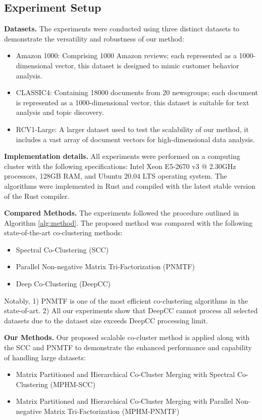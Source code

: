 \documentclass[journal]{IEEEtran}
\renewcommand{\cite}[1]{~\autocite{#1}}
\begin{document}
\subsection{Experiment Setup}

\textbf{Datasets.}
The experiments were conducted using three distinct datasets to demonstrate the versatility and robustness of our method:

\begin{itemize}
  \item Amazon 1000: Comprising 1000 Amazon reviews; each represented as a 1000-dimensional vector, this dataset is designed to mimic customer behavior analysis.
  \item CLASSIC4: Containing 18000 documents from 20 newsgroups; each document is represented as a 1000-dimensional vector, this dataset is suitable for text analysis and topic discovery.
  \item RCV1-Large: A larger dataset used to test the scalability of our method, it includes a vast array of document vectors for high-dimensional data analysis.
\end{itemize}

\textbf{Implementation details.}
All experiments were performed on a computing cluster with the following specifications: Intel Xeon E5-2670 v3 @ 2.30GHz processors, 128GB RAM, and Ubuntu 20.04 LTS operating system. The algorithms were implemented in Rust and compiled with the latest stable version of the Rust compiler.

\textbf{Compared Methods.}
The experiments followed the procedure outlined in Algorithm \ref{alg:method}. The proposed method was compared with the following state-of-the-art co-clustering methods:

\begin{itemize}
  \item Spectral Co-Clustering (SCC) \cite{dhillon2001CoclusteringDocumentsWords}
  \item Parallel Non-negative Matrix Tri-Factorization (PNMTF)\cite{chen2023ParallelNonNegativeMatrix}
  \item Deep Co-Clustering (DeepCC)\cite{dongkuanxu2019DeepCoClustering}
\end{itemize}

Notably, 1) PNMTF is one of the most efficient co-clustering algorithms in the state-of-art. 2) All our experiments show that DeepCC cannot process all selected datasets due to the dataset size exceeds DeepCC processing limit.

\textbf{Our Methods.} Our proposed scalable co-cluster method is applied along with the SCC and PNMTF to demonstrate the enhanced performance and capability of handling large datasets:
\begin{itemize}
  \item Matrix Partitioned and Hierarchical Co-Cluster Merging with Spectral Co-Clustering (MPHM-SCC)
  \item Matrix Partitioned and Hierarchical Co-Cluster Merging with Parallel Non-negative Matrix Tri-Factorization (MPHM-PNMTF)
\end{itemize}
\end{document}
